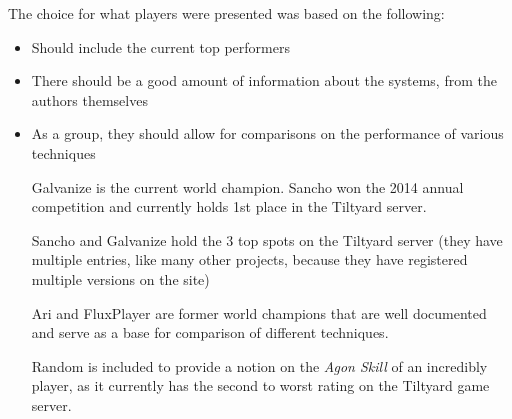 The choice for what players were presented was based on the following:
\begin{itemize}

\item Should include the current top performers 

\item There should be a good amount of information about the systems, from the authors themselves

\item As a group, they should allow for comparisons on the performance of various techniques


Galvanize is the current world champion. 
Sancho won the 2014 annual competition and currently holds 1st place in the Tiltyard server.

Sancho and Galvanize hold the 3 top spots on the Tiltyard server (they have multiple entries, like many other projects, because they have registered multiple versions on the site)

Ari and FluxPlayer are former world champions that are well documented and serve as a base for comparison of different techniques.

Random is included to provide a notion on the \textit{Agon Skill} of an incredibly player, as it currently has the second to worst rating on the Tiltyard game server.

\end{itemize}




